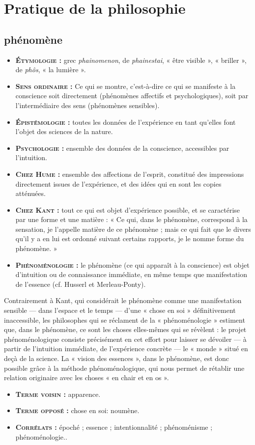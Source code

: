 \section{Pratique de la philosophie}

\subsection{phénomène}

\begin{itemize}[leftmargin=1cm, label=, itemsep=1pt]
\item {\bf \textsc{Étymologie} :} grec {\it phainomenon},
de {\it phainestai}, « être visible »,
« briller », de {\it phôs}, « la lumière ».
\item {\bf \textsc{Sens ordinaire} :} Ce qui se
montre, c’est-à-dire ce qui se manifeste
à la conscience soit directement
(phénomènes affectifs et
psychologiques), soit par l’intermédiaire
des sens (phénomènes sensibles).
\item {\bf \textsc{Épistémologie} :} toutes les
données de l'expérience en tant
qu’elles font l’objet des sciences de
la nature.
\item {\bf \textsc{Psychologie} :} ensemble des données de la
conscience, accessibles par l’intuition.
\item {\bf \textsc{Chez Hume} :} ensemble des
affections de l'esprit, constitué des
impressions directement issues de
l'expérience, et des idées qui en
sont les copies atténuées.
\item {\bf \textsc{Chez Kant} :} tout ce qui est objet d’expérience
possible, et se caractérise par
une forme et une matière : « Ce qui,
dans le phénomène, correspond à
la sensation, je l'appelle matière de
ce phénomène ; mais ce qui fait que
le divers qu'il y a en lui est ordonné
suivant certains rapports, je le
nomme forme du phénomène. »
\item {\bf \textsc{Phénoménologie} :} le  phénomène
(ce qui apparaît à la
conscience) est objet d’intuition ou
de connaissance immédiate, en
même temps que manifestation de
l'essence (cf. Husserl et Merleau-Ponty).
\end{itemize}

Contrairement à Kant, qui considérait le
phénomène comme une manifestation
sensible — dans l’espace et le temps —
d’une « chose en soi » définitivement inaccessible,
les philosophes qui se réclament
de la « phénoménologie » estiment que,
dans le phénomène, ce sont les choses
elles-mêmes qui se révèlent : le projet
phénoménologique consiste précisément
en cet effort pour laisser se dévoiler — à
partir de l'intuition immédiate, de l'expérience
concrète — le « monde » situé en
deçà de la science. La « vision des
essences », dans le phénomène, est donc
possible grâce à la méthode phénoménologique,
qui nous permet de rétablir
une relation originaire avec les choses
« en chair et en os ».

\begin{itemize}[leftmargin=1cm, label=, itemsep=1pt]
\item {\bf \textsc{Terme voisin} :} apparence.
\item {\bf \textsc{Terme opposé} :} chose en soi: noumène.
\item {\bf \textsc{Corrélats} :} époché ; essence ; intentionnalité ;
phénoménisme ; phénoménologie..
\end{itemize}
 
